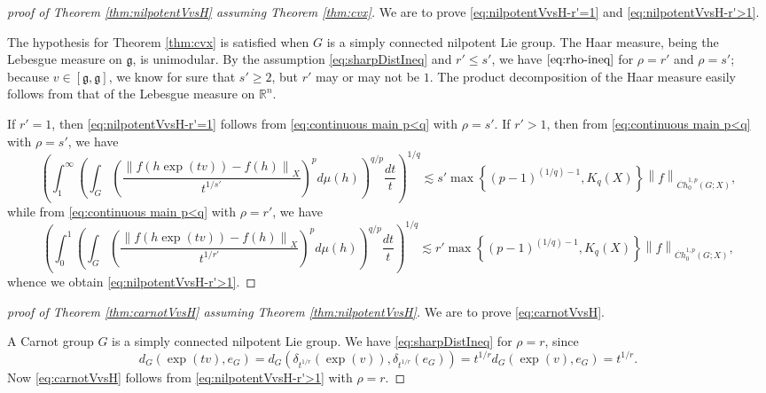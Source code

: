 \documentclass[11pt,reqno]{amsart}
\newcommand{\1}{\mathbf 1}
\begin{document}
\begin{proof}[proof of Theorem \ref{thm:nilpotentVvsH} assuming Theorem \ref{thm:cvx}]
    We are to prove \eqref{eq:nilpotentVvsH-r'=1} and \eqref{eq:nilpotentVvsH-r'>1}.

    The hypothesis for Theorem \ref{thm:cvx} is satisfied when $G$ is a simply connected nilpotent Lie group. The Haar measure, being the Lebesgue measure on $\mathfrak{g}$, is unimodular. By the assumption \eqref{eq:sharpDistIneq} and $r'\le s'$, we have $\eqref{eq:rho-ineq}$ for $\rho=r'$ and $\rho=s'$; because $v\in \left[\mathfrak{g},\mathfrak{g}\right]$, we know for sure that $s'\ge 2$, but $r'$ may or may not be $1$. The product decomposition of the Haar measure easily follows from that of the Lebesgue measure on $\mathbb{R}^n$.%

    If $r'=1$, then \eqref{eq:nilpotentVvsH-r'=1} follows from \eqref{eq:continuous main p<q} with $\rho=s'$. If $r'>1$, then from \eqref{eq:continuous main p<q} with $\rho=s'$, we have
\[
\left(\int_1^\infty \left(\int_{G}\left(\frac{\left\|f\left(h\exp\left(tv\right)\right)-f\left(h\right)\right\|_X}{t^{1/s'}}\right)^pd\mu\left(h\right)\right)^{q/p}\frac{dt}{t}\right)^{1/q}\lesssim s'\max\left\{\left(p-1\right)^{(1/q)-1},K_q\left(X\right)\right\} \left\|f\right\|_{\dot{Ch}_0^{1,p}\left(G;X\right)},
\]
while from \eqref{eq:continuous main p<q} with $\rho=r'$, we have
    \[
\left(\int_0^1 \left(\int_{G}\left(\frac{\left\|f\left(h\exp\left(tv\right)\right)-f\left(h\right)\right\|_X}{t^{1/r'}}\right)^pd\mu\left(h\right)\right)^{q/p}\frac{dt}{t}\right)^{1/q}\lesssim r'\max\left\{\left(p-1\right)^{(1/q)-1},K_q\left(X\right)\right\} \left\|f\right\|_{\dot{Ch}_0^{1,p}\left(G;X\right)},
\]
whence we obtain \eqref{eq:nilpotentVvsH-r'>1}.
\end{proof}

\begin{proof}[proof of Theorem \ref{thm:carnotVvsH} assuming Theorem \ref{thm:nilpotentVvsH}]
We are to prove \eqref{eq:carnotVvsH}.

    A Carnot group $G$ is a simply connected nilpotent Lie group. We have \eqref{eq:sharpDistIneq} for $\rho=r$, since
    \[
    d_G\left(\exp\left(tv\right),e_G\right)=d_G\left(\delta_{t^{1/r}}\left(\exp\left(v\right)\right),\delta_{t^{1/r}}\left(e_G\right)\right)=t^{1/r}d_G\left(\exp\left(v\right),e_G\right)=t^{1/r}.
    \]
    Now \eqref{eq:carnotVvsH} follows from \eqref{eq:nilpotentVvsH-r'>1} with $\rho=r$.
\end{proof}
\end{document}
